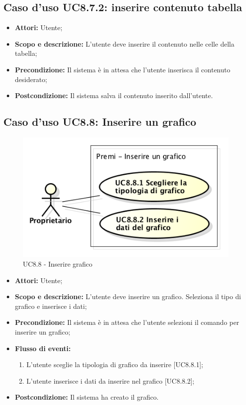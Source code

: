 	\subsection{Caso d'uso UC8.7.2: inserire contenuto tabella}
	\begin{itemize}
		\item \textbf{Attori:} Utente;
		\item \textbf{Scopo e descrizione:} L'utente deve inserire il contenuto nelle celle della tabella;
		\item \textbf{Precondizione:} Il sistema è in attesa che l'utente inserisca il contenuto desiderato;
		\item \textbf{Postcondizione:} Il sistema salva il contenuto inserito dall'utente.
	\end{itemize}


\subsection{Caso d'uso UC8.8: Inserire un grafico}
\begin{figure}[h] 
	\centering 
	\includegraphics[scale=0.45] {img/UC8.8.png} 
	\caption{UC8.8 - Inserire grafico} 
\end{figure}

\begin{itemize}
	\item \textbf{Attori:} Utente;
	\item \textbf{Scopo e descrizione:} L'utente deve inserire un grafico. Seleziona il tipo di grafico e inserisce i dati;
	\item \textbf{Precondizione:} Il sistema è in attesa che l'utente selezioni il comando per inserire un grafico;
	\item \textbf{Flusso di eventi:}
	\begin{enumerate}
		\item L'utente sceglie la tipologia di grafico da inserire [UC8.8.1];
		\item L'utente inserisce i dati da inserire nel grafico [UC8.8.2];
	\end{enumerate}
	\item \textbf{Postcondizione:} Il sistema ha creato il grafico.
\end{itemize}

